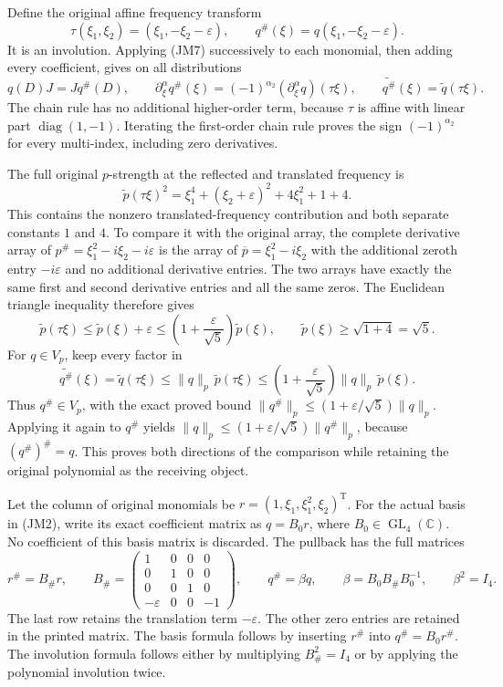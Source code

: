 \documentclass[
  11pt,
]{article}
\begin{document}
Define the original affine frequency transform \[
 \tau(\xi_1,\xi_2)=(\xi_1,-\xi_2-\varepsilon),\qquad
 q^\#(\xi)=q(\xi_1,-\xi_2-\varepsilon).
\]
It is an involution. Applying (JM7) successively to each monomial, then
adding every coefficient, gives on all distributions
\[
 q(D)J=Jq^\#(D),\qquad
 \partial_\xi^\alpha q^\#(\xi)
       =(-1)^{\alpha_2}(\partial_\xi^\alpha q)(\tau\xi),
 \qquad
 \widetilde{q^\#}(\xi)=\widetilde q(\tau\xi).
 \tag{JM8}
\] The chain rule has no additional higher-order
term, because \(\tau\) is affine with linear part
\(\operatorname{diag}(1,-1)\). Iterating the first-order chain rule proves the
sign \((-1)^{\alpha_2}\) for every multi-index, including zero
derivatives.

The full original \(p\)-strength at the reflected and
translated frequency is \[
 \widetilde p(\tau\xi)^2
    =\xi_1^4+(\xi_2+\varepsilon)^2+4\xi_1^2+1+4.
 \tag{JM9}
\] This contains the
nonzero translated-frequency contribution and both separate constants
\(1\) and \(4\). To compare it with
the original array, the complete derivative array of
\(p^\#=\xi_1^2-i\xi_2-i\varepsilon\) is the array of \(\overline p=\xi_1^2-i\xi_2\) with the
additional zeroth entry \(-i\varepsilon\) and no additional
derivative entries. The two arrays have exactly the same first and
second derivative entries and all the same zeros. The Euclidean triangle
inequality therefore gives \[
 \widetilde p(\tau\xi)\leq\widetilde p(\xi)+\varepsilon
       \leq\left(1+\frac{\varepsilon}{\sqrt5}\right)\widetilde p(\xi),
 \qquad \widetilde p(\xi)\geq\sqrt{1+4}=\sqrt5 .
\] For
\(q\in V_p\), keep every factor in \[
 \widetilde{q^\#}(\xi)
       =\widetilde q(\tau\xi)
       \leq\|q\|_p\,\widetilde p(\tau\xi)
       \leq\left(1+\frac{\varepsilon}{\sqrt5}\right)
                  \|q\|_p\,\widetilde p(\xi).
 \tag{JM10}
\]
Thus \(q^\#\in V_p\), with the exact proved bound
\(\|q^\#\|_p\leq(1+\varepsilon/\sqrt5)\|q\|_p\). Applying it again to \(q^\#\)
yields \(\|q\|_p\leq(1+\varepsilon/\sqrt5)\|q^\#\|_p\), because \((q^\#)^\#=q\). This
proves both directions of the comparison while retaining the original
polynomial as the receiving object.

Let the column of original monomials be \(r=(1,\xi_1,\xi_1^2,\xi_2)^{\mathrm T}\). For the
actual basis in (JM2), write its exact coefficient matrix as
\(q=B_0r\), where \(B_0\in\operatorname{GL}_4(\mathbb C)\). No coefficient
of this basis matrix is discarded. The pullback has the full matrices
\[
 r^\#=B_\#r,\qquad
 B_\#=
 \begin{pmatrix}
 1&0&0&0\\
 0&1&0&0\\
 0&0&1&0\\
 -\varepsilon&0&0&-1
 \end{pmatrix},\qquad
 q^\#=\beta q,\qquad
 \beta=B_0B_\#B_0^{-1},\qquad \beta^2=I_4 .
 \tag{JM11}
\] The last row retains the translation term
\(-\varepsilon\). The other zero entries are retained in the
printed matrix. The basis formula follows by inserting
\(r^\#\) into \(q^\#=B_0r^\#\). The involution
formula follows either by multiplying \(B_\#^2=I_4\) or by
applying the polynomial involution twice.
\end{document}
